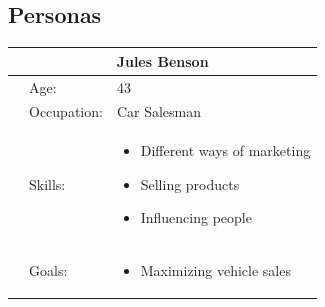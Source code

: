         \subsection{Personas}
            {\raggedright

            \vspace{3pt} \noindent
            \begin{tabular}{|p{130pt}|p{88pt}|p{207pt}|}
            \hline
            \multicolumn{3}{|c|}{\parbox{426pt}{\centering
            Jules Benson
            }} \\
            \hline
            \parbox{130pt}{\raggedright {}} & \parbox{88pt}{\raggedright
            Age:
            } & \parbox{207pt}{\raggedright
            43
            } \\
             & \parbox{88pt}{\raggedright
            Occupation:
            } & \parbox{207pt}{\raggedright
            Car Salesman
            } \\
             & \parbox{88pt}{\raggedright
            Skills:
            } & \parbox{207pt}{\raggedright
            \begin{itemize}
                \item Different ways of marketing
                \item Selling products
                \item Influencing people
            \end{itemize}
            } \\
             & \parbox{88pt}{\raggedright
            Goals:
            } & \parbox{207pt}{\raggedright
            \begin{itemize}
                \item Maximizing vehicle sales

\end{itemize}}
\end{tabular}}
